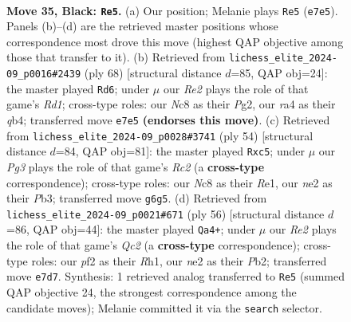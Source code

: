 \documentclass[11pt]{article}
\begin{document}
\clearpage

\begin{figure}[p]\centering
\begin{subfigure}{0.46\textwidth}\centering
\resizebox{\linewidth}{!}{%
\newchessgame
\chessboard[
  setfen={1rn5/4rk2/p2p2pQ/3P3p/Rpq1p2P/7R/4NPP1/5K2 b - - 2 35},
  showmover=false,
  pgfstyle=straightmove, color=movearrow, markmove={e7-e5}
]}
\caption{}
\end{subfigure}\hfill
\begin{subfigure}{0.46\textwidth}\centering
\resizebox{\linewidth}{!}{%
\newchessgame
\chessboard[
  setfen={8/5rk1/p3p2p/P1r3p1/1q2P1N1/4Q2P/1P3PP1/3R2K1 w - - 9 35},
  showmover=false,
  pgfstyle=straightmove, color=movearrow, markmove={d1-d6}
]}
\caption{}
\end{subfigure}
\\[4pt]
\begin{subfigure}{0.46\textwidth}\centering
\resizebox{\linewidth}{!}{%
\newchessgame
\chessboard[
  setfen={3r2k1/5pp1/pp6/2r1P2p/3p1P1P/qP1Q2P1/P1R4K/4R3 w - - 3 28},
  showmover=false,
  pgfstyle=straightmove, color=movearrow, markmove={c2-c5}
]}
\caption{}
\end{subfigure}\hfill
\begin{subfigure}{0.46\textwidth}\centering
\resizebox{\linewidth}{!}{%
\newchessgame
\chessboard[
  setfen={1r2k2r/5p2/p6p/2b1p3/2p4P/P1P2P2/qPQ5/1NK4R w k - 0 29},
  showmover=false,
  pgfstyle=straightmove, color=movearrow, markmove={c2-a4}
]}
\caption{}
\end{subfigure}
\caption{\textbf{Move 35, Black: \texttt{Re5}.} (a) Our position; Melanie plays \texttt{Re5} (\texttt{e7e5}). Panels (b)--(d) are the retrieved master positions whose correspondence most drove this move (highest QAP objective among those that transfer to it). (b) Retrieved from \texttt{lichess\_elite\_2024-09\_p0016\#2439} (ply 68) [structural distance $d$=85, QAP obj=24]: the master played \texttt{Rd6}; under $\mu$ our \emph{Re2} plays the role of that game's \emph{Rd1}; cross-type roles: our \emph{N}c8 as their \emph{P}g2, our \emph{r}a4 as their \emph{q}b4; transferred move \texttt{e7e5} \textbf{(endorses this move)}. (c) Retrieved from \texttt{lichess\_elite\_2024-09\_p0028\#3741} (ply 54) [structural distance $d$=84, QAP obj=81]: the master played \texttt{Rxc5}; under $\mu$ our \emph{Pg3} plays the role of that game's \emph{Rc2} (a \textbf{cross-type} correspondence); cross-type roles: our \emph{N}c8 as their \emph{R}e1, our \emph{n}e2 as their \emph{P}b3; transferred move \texttt{g6g5}. (d) Retrieved from \texttt{lichess\_elite\_2024-09\_p0021\#671} (ply 56) [structural distance $d$=86, QAP obj=44]: the master played \texttt{Qa4+}; under $\mu$ our \emph{Re2} plays the role of that game's \emph{Qc2} (a \textbf{cross-type} correspondence); cross-type roles: our \emph{p}f2 as their \emph{R}h1, our \emph{n}e2 as their \emph{P}b2; transferred move \texttt{e7d7}. Synthesis: 1 retrieved analog transferred to \texttt{Re5} (summed QAP objective 24, the strongest correspondence among the candidate moves); Melanie committed it via the \texttt{search} selector.}
\label{fig:thought-m69}
\end{figure}
\end{document}
